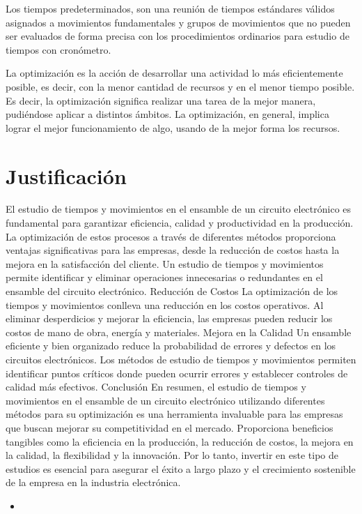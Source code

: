     
    Los tiempos predeterminados, son una reunión de tiempos estándares válidos asignados a movimientos fundamentales y grupos de movimientos que no pueden ser evaluados de forma precisa con los procedimientos ordinarios para estudio de tiempos con cronómetro.
    
    
    La optimización es la acción de desarrollar una actividad lo más eficientemente posible, es decir, con la menor cantidad de recursos y en el menor tiempo posible. Es decir, la optimización significa realizar una tarea de la mejor manera, pudiéndose aplicar a distintos ámbitos. La optimización, en general, implica lograr el mejor funcionamiento de algo, usando de la mejor forma los recursos.
    
    \section{Justificación}
    El estudio de tiempos y movimientos en el ensamble de un circuito electrónico es fundamental para garantizar eficiencia, calidad y productividad en la producción. La optimización de estos procesos a través de diferentes métodos proporciona ventajas significativas para las empresas, desde la reducción de costos hasta la mejora en la satisfacción del cliente.
    Un estudio de tiempos y movimientos permite identificar y eliminar operaciones innecesarias o redundantes en el ensamble del circuito electrónico.
    Reducción de Costos
    La optimización de los tiempos y movimientos conlleva una reducción en los costos operativos. Al eliminar desperdicios y mejorar la eficiencia, las empresas pueden reducir los costos de mano de obra, energía y materiales.
    Mejora en la Calidad
    Un ensamble eficiente y bien organizado reduce la probabilidad de errores y defectos en los circuitos electrónicos. Los métodos de estudio de tiempos y movimientos permiten identificar puntos críticos donde pueden ocurrir errores y establecer controles de calidad más efectivos.
    Conclusión
    En resumen, el estudio de tiempos y movimientos en el ensamble de un circuito electrónico utilizando diferentes métodos para su optimización es una herramienta invaluable para las empresas que buscan mejorar su competitividad en el mercado. Proporciona beneficios tangibles como la eficiencia en la producción, la reducción de costos, la mejora en la calidad, la flexibilidad y la innovación. Por lo tanto, invertir en este tipo de estudios es esencial para asegurar el éxito a largo plazo y el crecimiento sostenible de la empresa en la industria electrónica.
    \begin{itemize}
        \item 
    \end{itemize}
